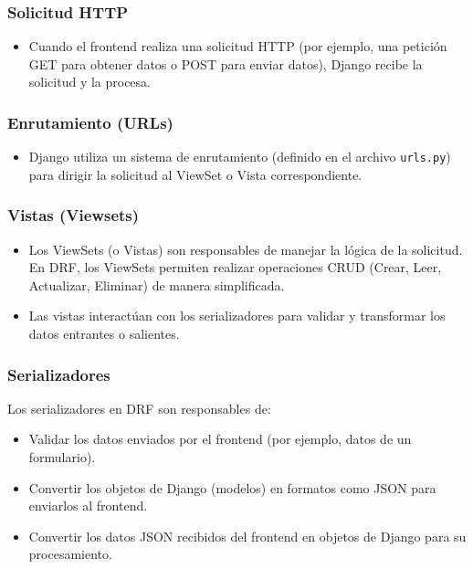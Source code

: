 \documentclass{report}
\begin{document}
    \subsubsection*{Solicitud HTTP}
    \begin{itemize}
        \item Cuando el frontend realiza una solicitud HTTP (por ejemplo, una petición GET para obtener datos o POST para enviar datos), Django recibe la solicitud y la procesa.
    \end{itemize}
    
    \subsubsection*{Enrutamiento (URLs)}
    \begin{itemize}
        \item Django utiliza un sistema de enrutamiento (definido en el archivo \texttt{urls.py}) para dirigir la solicitud al ViewSet o Vista correspondiente.
    \end{itemize}
    
    \subsubsection*{Vistas (Viewsets)}
    \begin{itemize}
        \item Los ViewSets (o Vistas) son responsables de manejar la lógica de la solicitud. En DRF, los ViewSets permiten realizar operaciones CRUD (Crear, Leer, Actualizar, Eliminar) de manera simplificada.
        \item Las vistas interactúan con los serializadores para validar y transformar los datos entrantes o salientes.
    \end{itemize}
    
    \subsubsection*{Serializadores}
    Los serializadores en DRF son responsables de:
    \begin{itemize}
        \item Validar los datos enviados por el frontend (por ejemplo, datos de un formulario).
        \item Convertir los objetos de Django (modelos) en formatos como JSON para enviarlos al frontend.
        \item Convertir los datos JSON recibidos del frontend en objetos de Django para su procesamiento.
    \end{itemize}
    
\end{document}
